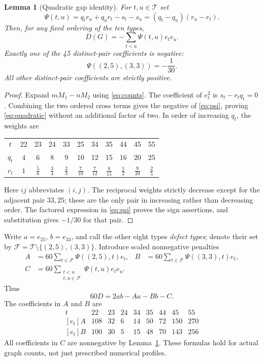 \documentclass[11pt]{amsart}
\newtheorem{lemma}[theorem]{Lemma}
\theoremstyle{definition}
\theoremstyle{remark}
\newcommand{\T}{\mathcal T}
\newcommand{\F}{\mathcal F}
\begin{document}
\begin{lemma}[Quadratic gap identity]\label{lem:quadratic}
For $t,u\in\T$ set
\begin{equation}\label{eq:psi}
 \Psi(t,u)=q_tr_u+q_ur_t-s_t-s_u=(q_t-q_u)(r_u-r_t).
\end{equation}
Then, for any fixed ordering of the ten types,
\begin{equation}\label{eq:quadratic}
 D(G)=-\sum_{t<u}\Psi(t,u)e_te_u.
\end{equation}
Exactly one of the 45 distinct-pair coefficients is negative:
\[
 \Psi((2,5),(3,3))=-\frac1{30}.
\]
All other distinct-pair coefficients are strictly positive.
\end{lemma}
\begin{proof}
Expand $mM_1-nM_2$ using \eqref{eq:counts}. The coefficient of $e_t^2$ is $s_t-r_tq_t=0$. Combining the two ordered cross terms gives the negative of \eqref{eq:psi}, proving \eqref{eq:quadratic} without an additional factor of two. In order of increasing $q_t$, the weights are
\begin{center}
\begin{tabular}{c*{10}{c}}
\toprule
$t$&22&23&24&33&25&34&35&44&45&55\\
$q_t$&4&6&8&9&10&12&15&16&20&25\\
$r_t$&$1$&$\frac56$&$\frac34$&$\frac23$&$\frac7{10}$&$\frac7{12}$&$\frac8{15}$&$\frac12$&$\frac9{20}$&$\frac25$\\
\bottomrule
\end{tabular}
\end{center}
Here $ij$ abbreviates $(i,j)$. The reciprocal weights strictly decrease except for the adjacent pair $33,25$; these are the only pair in increasing rather than decreasing order. The factored expression in \eqref{eq:psi} proves the sign assertions, and substitution gives $-1/30$ for that pair.
\end{proof}

Write $a=e_{25}$, $b=e_{33}$, and call the other eight types \emph{defect types}; denote their set by $\F=\T\setminus\{(2,5),(3,3)\}$. Introduce scaled nonnegative penalties
\begin{align}
 A&=60\sum_{t\in\F}\Psi((2,5),t)e_t,&
 B&=60\sum_{t\in\F}\Psi((3,3),t)e_t,\label{eq:AB}\\
 C&=60\sum_{\substack{t<u\\t,u\in\F}}\Psi(t,u)e_te_u.&&\label{eq:C}
\end{align}
Thus
\begin{equation}\label{eq:penalty}
 60D=2ab-Aa-Bb-C.
\end{equation}
The coefficients in $A$ and $B$ are
\begin{equation}\label{eq:table}
\begin{array}{c|rrrrrrrr}
 t&22&23&24&34&35&44&45&55\\\hline
 {[e_t]A}&108&32&6&14&50&72&150&270\\
 {[e_t]B}&100&30&5&15&48&70&143&256
\end{array}
\end{equation}
All coefficients in $C$ are nonnegative by Lemma~\ref{lem:quadratic}. These formulas hold for actual graph counts, not just prescribed numerical profiles.
\end{document}
